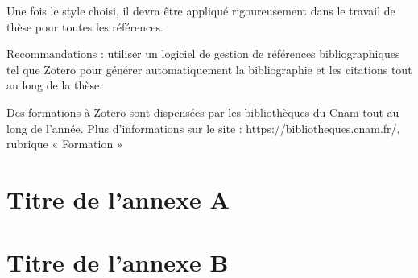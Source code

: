 \documentclass[a4paper,11pt,twoside,openright,notitlepage]{book}
\begin{document}
Une fois le style choisi, il devra être appliqué rigoureusement dans le travail de thèse pour toutes les références.
 
Recommandations : utiliser un logiciel de gestion de références bibliographiques tel que Zotero pour générer automatiquement la bibliographie et les citations tout au long de la thèse.
 
Des formations à Zotero sont dispensées par les bibliothèques du Cnam tout au long de l’année. Plus d’informations sur le site : https://bibliotheques.cnam.fr/, rubrique « Formation »\\

\newpage
\thispagestyle{empty}
\clearpage

%
%



%



\thispagestyle{empty}



\newpage
\appendix
{}
\chapter{Titre de l'annexe A}
\chapter{Titre de l'annexe B}
\newpage

%


\end{document}
